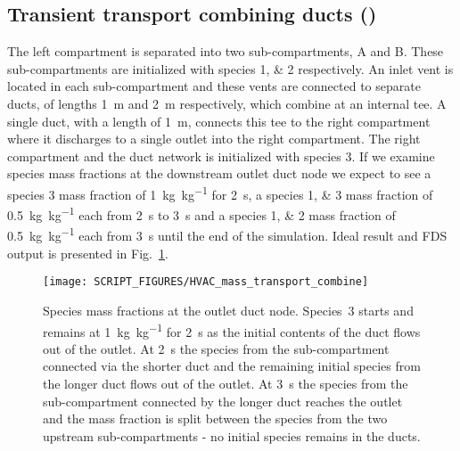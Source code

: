 \documentclass[11pt]{book}
\begin{document}
\subsection{Transient transport combining ducts (\texorpdfstring{}{HVAC\_mass\_transport\_combine})}
\label{HVAC_mass_transport_combine}
The left compartment is separated into two sub-compartments, A and B. These sub-compartments are initialized with species \numlist{1;2} respectively. An inlet vent is located in each sub-compartment and these vents are connected to separate ducts, of lengths \SI{1}{\meter} and \SI{2}{\meter} respectively, which combine at an internal tee. A single duct, with a length of \SI{1}{\meter}, connects this tee to the right compartment where it discharges to a single outlet into the right compartment. The right compartment and the duct network is initialized with species \num{3}. If we examine species mass fractions at the downstream outlet duct node we expect to see a species \num{3} mass fraction of \SI[per-mode=symbol]{1}{\kilogram\per\kilogram} for \SI{2}{\second}, a species \numlist{1;3} mass fraction of \SI[per-mode=symbol]{0.5}{\kilogram\per\kilogram} each from \SI{2}{\second} to \SI{3}{\second} and a species \numlist{1;2} mass fraction of \SI[per-mode=symbol]{0.5}{\kilogram\per\kilogram} each from \SI{3}{\second} until the end of the simulation. Ideal result and FDS output is presented in Fig.~\ref{fig_HVAC_mass_transport_combine}.

\begin{figure}[ht]
\centering
\texttt{[image: SCRIPT\_FIGURES/HVAC\_mass\_transport\_combine]}
\caption[ test case]{Species mass fractions at the outlet duct node. Species~3 starts and remains at \SI[per-mode=symbol]{1}{\kilogram\per\kilogram} for \SI{2}{\second} as the initial contents of the duct flows out of the outlet. At \SI{2}{\second} the species from the sub-compartment connected via the shorter duct and the remaining initial species from the longer duct flows out of the outlet. At \SI{3}{\second} the species from the sub-compartment connected by the longer duct reaches the outlet and the mass fraction is split between the species from the two upstream sub-compartments - no initial species remains in the ducts.}
\label{fig_HVAC_mass_transport_combine}
\end{figure}
\end{document}
